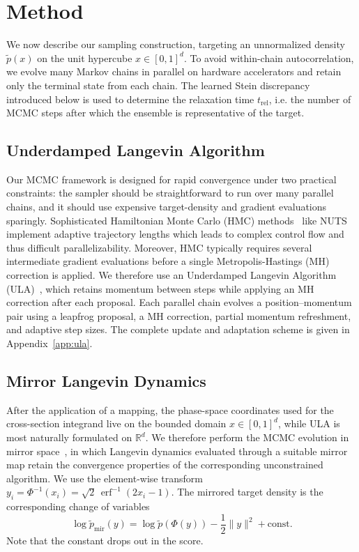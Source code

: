 \documentclass{article}
\begin{document}
\section{Method}

We now describe our sampling construction, targeting an unnormalized density $\widetilde{p}(x)$ on the unit hypercube $x\in[0,1]^d$.
To avoid within-chain autocorrelation, we evolve many Markov chains in parallel on hardware accelerators and retain only the terminal state from each chain.
The learned Stein discrepancy introduced below is used to determine the relaxation time $t_{\mathrm{rel}}$, i.e. the number of MCMC steps after which the ensemble is representative of the target.

\subsection{Underdamped Langevin Algorithm}
Our MCMC framework is designed for rapid convergence under two practical constraints: the sampler should be straightforward to run over many parallel chains, and it should use expensive target-density and gradient evaluations sparingly.
Sophisticated Hamiltonian Monte Carlo (HMC) methods~\cite{neal2011mcmc} like NUTS~\cite{hoffman2014no} implement adaptive trajectory lengths which leads to complex control flow and thus difficult parallelizability.
Moreover, HMC typically requires several intermediate gradient evaluations before a single Metropolis-Hastings (MH) correction is applied.
We therefore use an Underdamped Langevin Algorithm (ULA)~\cite{roberts1996exponential,cheng2018underdamped}, which retains momentum between steps while applying an MH correction after each proposal.
Each parallel chain evolves a position--momentum pair using a leapfrog proposal, a MH correction, partial momentum refreshment, and adaptive step sizes.
The complete update and adaptation scheme is given in Appendix~\ref{app:ula}.

\subsection{Mirror Langevin Dynamics}
After the application of a mapping, the phase-space coordinates used for the cross-section integrand live on the bounded domain $x\in[0,1]^d$, while ULA is most naturally formulated on $\mathbb{R}^d$.
We therefore perform the MCMC evolution in mirror space~\cite{Hsieh:2018mld}, in which Langevin dynamics evaluated through a suitable mirror map retain the convergence properties of the corresponding unconstrained algorithm.
We use the element-wise transform $y_i = \Phi^{-1}(x_i) = \sqrt{2}\,\operatorname{erf}^{-1}(2x_i-1)$.
The mirrored target density is the corresponding change of variables
\begin{equation}
  \log \widetilde{p}_{\mathrm{mir}}(y) = \log \widetilde{p}(\Phi(y)) - \frac{1}{2}\lVert y\rVert^2 + \mathrm{const.}
\end{equation}
Note that the constant drops out in the score.
\end{document}
